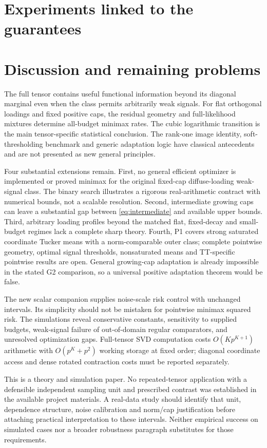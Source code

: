 \documentclass[11pt]{article}
\begin{document}
\section{Experiments linked to the guarantees}\label{sec:experiments}


\section{Discussion and remaining problems}\label{sec:discussion}
The full tensor contains useful functional information beyond its diagonal marginal even when the class permits arbitrarily weak signals. For flat orthogonal loadings and fixed positive caps, the residual geometry and full-likelihood mixtures determine all-budget minimax rates. The cubic logarithmic transition is the main tensor-specific statistical conclusion. The rank-one image identity, soft-thresholding benchmark and generic adaptation logic have classical antecedents and are not presented as new general principles.

Four substantial extensions remain. First, no general efficient optimizer is implemented or proved minimax for the original fixed-cap diffuse-loading weak-signal class. The binary search illustrates a rigorous real-arithmetic contract with numerical bounds, not a scalable resolution. Second, intermediate growing caps can leave a substantial gap between \eqref{eq:intermediate} and available upper bounds. Third, arbitrary loading profiles beyond the matched flat, fixed-decay and small-budget regimes lack a complete sharp theory. Fourth, P1 covers strong saturated coordinate Tucker means with a norm-comparable outer class; complete pointwise geometry, optimal signal thresholds, nonsaturated means and TT-specific pointwise results are open. General growing-cap adaptation is already impossible in the stated G2 comparison, so a universal positive adaptation theorem would be false.

The new scalar companion supplies noise-scale risk control with unchanged intervals. Its simplicity should not be mistaken for pointwise minimax squared risk. The simulations reveal conservative constants, sensitivity to supplied budgets, weak-signal failure of out-of-domain regular comparators, and unresolved optimization gaps. Full-tensor SVD computation costs $O(Kp^{K+1})$ arithmetic with $O(p^K+p^2)$ working storage at fixed order; diagonal coordinate access and dense rotated contraction costs must be reported separately.

This is a theory and simulation paper. No repeated-tensor application with a defensible independent sampling unit and prescribed contrast was established in the available project materials. A real-data study should identify that unit, dependence structure, noise calibration and norm/cap justification before attaching practical interpretation to these intervals. Neither empirical success on simulated cases nor a broader robustness paragraph substitutes for those requirements.


\end{document}

